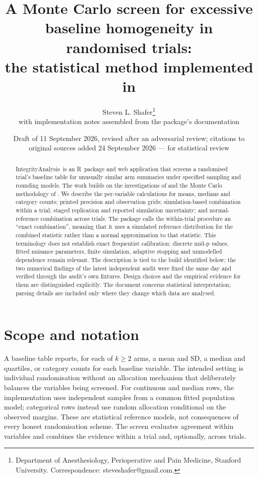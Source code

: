 \documentclass[11pt,a4paper]{article}
\title{A Monte Carlo screen for excessive baseline homogeneity in randomised trials:\\ the statistical method implemented in \pkg}
\author{Steven L. Shafer\thanks{Department of Anesthesiology, Perioperative and Pain Medicine, Stanford University. Correspondence: steveshafer@gmail.com.}\\[2pt]
\small with implementation notes assembled from the package's documentation}
\date{Draft of 11 September 2026, revised after an adversarial review; citations to original sources added 24 September 2026 --- for statistical review}
\newcommand{\pkg}{\textsf{IntegrityAnalysis}}
\newcommand{\R}{\textsf{R}}
\begin{document}
\maketitle

\begin{abstract}
\noindent
\pkg\ is an \R\ package and web application that screens a randomised trial's baseline table for unusually similar arm summaries under specified sampling and rounding models. The work builds on the investigations of \citet{carlisle2012} and the Monte Carlo methodology of \citet{carlisle2015,carlisle2017}. We describe the per-variable calculations for means, medians and category counts; printed precision and observation grids; simulation-based combination within a trial; staged replication and reported simulation uncertainty; and normal-reference combination across trials. The package calls the within-trial procedure an ``exact combination'', meaning that it uses a simulated reference distribution for the combined statistic rather than a normal approximation to that statistic. This terminology does not establish exact frequentist calibration: discrete mid-p values, fitted nuisance parameters, finite simulation, adaptive stopping and unmodelled dependence remain relevant. The description is tied to the build identified below; the two numerical findings of the latest independent audit were fixed the same day and verified through the audit's own fixtures. Design choices and the empirical evidence for them are distinguished explicitly. The document concerns statistical interpretation; parsing details are included only where they change which data are analysed.
\end{abstract}

\tableofcontents
\bigskip

\section{Scope and notation}
\label{sec:scope}

A baseline table reports, for each of $k \ge 2$ arms, a mean and SD, a median and quartiles, or category counts for each baseline variable. The intended setting is individual randomisation without an allocation mechanism that deliberately balances the variables being screened. For continuous and median rows, the implementation uses independent samples from a common fitted population model; categorical rows instead use random allocation conditional on the observed margins. These are statistical reference models, not consequences of every honest randomisation scheme. The screen evaluates agreement within variables and combines the evidence within a trial and, optionally, across trials.
\end{document}
